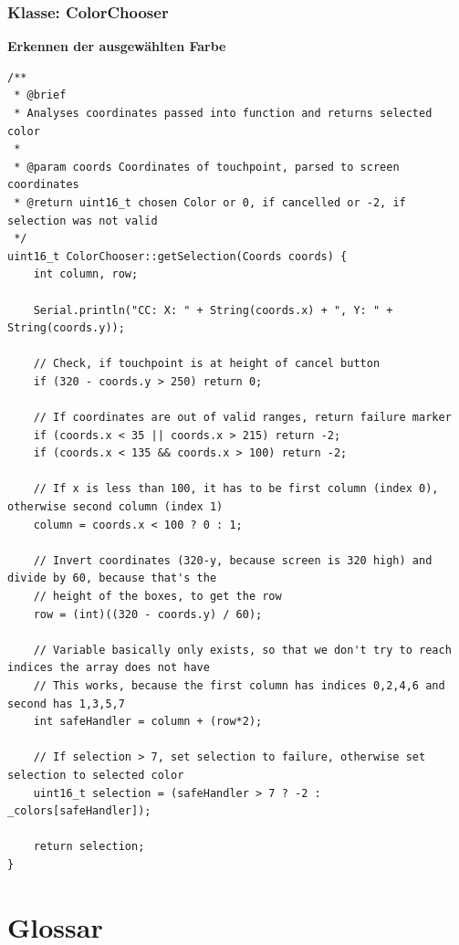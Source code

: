 \documentclass[a4paper, 11pt]{scrartcl}
\begin{document}
\begin{small}
\subsubsection{Klasse: ColorChooser}
\begin{flushleft}\textbf{Erkennen der ausgewählten Farbe}\label{code:color}\end{flushleft}
\begin{lstlisting}
/**
 * @brief 
 * Analyses coordinates passed into function and returns selected color
 * 
 * @param coords Coordinates of touchpoint, parsed to screen coordinates
 * @return uint16_t chosen Color or 0, if cancelled or -2, if selection was not valid
 */
uint16_t ColorChooser::getSelection(Coords coords) {
    int column, row;

    Serial.println("CC: X: " + String(coords.x) + ", Y: " + String(coords.y));

    // Check, if touchpoint is at height of cancel button
    if (320 - coords.y > 250) return 0;

    // If coordinates are out of valid ranges, return failure marker
    if (coords.x < 35 || coords.x > 215) return -2;
    if (coords.x < 135 && coords.x > 100) return -2;

    // If x is less than 100, it has to be first column (index 0), otherwise second column (index 1)
    column = coords.x < 100 ? 0 : 1;

    // Invert coordinates (320-y, because screen is 320 high) and divide by 60, because that's the 
    // height of the boxes, to get the row
    row = (int)((320 - coords.y) / 60);

    // Variable basically only exists, so that we don't try to reach indices the array does not have
    // This works, because the first column has indices 0,2,4,6 and second has 1,3,5,7
    int safeHandler = column + (row*2);

    // If selection > 7, set selection to failure, otherwise set selection to selected color
    uint16_t selection = (safeHandler > 7 ? -2 : _colors[safeHandler]);

    return selection;
}
\end{lstlisting}











\end{small}
\newpage
\section{Glossar}
\end{document}
